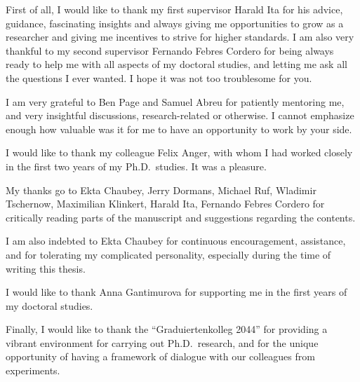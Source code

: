 {
  \setlength{\parskip}{2pt}
  First of all, I would like to thank my first supervisor Harald Ita for his advice, guidance, fascinating insights
  and always giving me opportunities to grow as a researcher and giving me incentives to strive for higher standards.
  I am also very thankful to my second supervisor Fernando Febres Cordero for 
  being always ready to help me with all aspects of my doctoral studies,
  and letting me ask all the questions I ever wanted.
  I hope it was not too troublesome for you.

  I am very grateful to Ben Page and Samuel Abreu for patiently mentoring me,
  and very insightful discussions, research-related or otherwise.
  I cannot emphasize enough how valuable was it for me to have an opportunity to work by your side.

  I would like to thank my colleague Felix Anger, with whom I had worked closely in the first two years of my Ph.D.\ studies.
  It was a pleasure.

  My thanks go to Ekta Chaubey, Jerry Dormans, Michael Ruf, Wladimir Tschernow, Maximilian Klinkert, Harald Ita, Fernando Febres Cordero for critically reading parts of the manuscript and suggestions
  regarding the contents.

  I am also indebted to Ekta Chaubey for continuous encouragement, assistance, and for tolerating my complicated personality, especially during the time of writing this thesis. 

  I would like to thank Anna Gantimurova for supporting me in the first years of my doctoral studies.

  Finally, I would like to thank the ``Graduiertenkolleg 2044'' for providing a vibrant environment for carrying out Ph.D.\ research,   
  and for the unique opportunity of having a framework of dialogue with our colleagues from experiments. 






}
